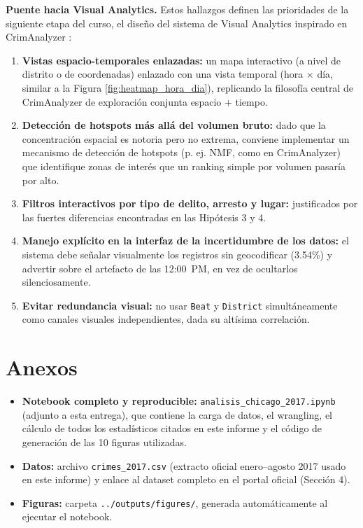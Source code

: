 \documentclass[11pt,a4paper]{article}
\begin{document}
\textbf{Puente hacia Visual Analytics.} Estos hallazgos definen las
prioridades de la siguiente etapa del curso, el diseño del sistema de Visual
Analytics inspirado en CrimAnalyzer \cite{crimanalyzer}:

\begin{enumerate}
    \item \textbf{Vistas espacio-temporales enlazadas:} un mapa interactivo
    (a nivel de distrito o de coordenadas) enlazado con una vista temporal
    (hora $\times$ día, similar a la Figura \ref{fig:heatmap_hora_dia}),
    replicando la filosofía central de CrimAnalyzer de exploración conjunta
    espacio + tiempo.
    \item \textbf{Detección de hotspots más allá del volumen bruto:} dado
    que la concentración espacial es notoria pero no extrema, conviene
    implementar un mecanismo de detección de hotspots (p. ej. NMF, como en
    CrimAnalyzer) que identifique zonas de interés que un ranking simple por
    volumen pasaría por alto.
    \item \textbf{Filtros interactivos por tipo de delito, arresto y lugar:}
    justificados por las fuertes diferencias encontradas en las Hipótesis
    3 y 4.
    \item \textbf{Manejo explícito en la interfaz de la incertidumbre de los
    datos:} el sistema debe señalar visualmente los registros sin
    geocodificar (3.54\%) y advertir sobre el artefacto de las 12:00~PM, en
    vez de ocultarlos silenciosamente.
    \item \textbf{Evitar redundancia visual:} no usar \texttt{Beat} y 
    \texttt{District} simultáneamente como canales visuales independientes,
    dada su altísima correlación.
\end{enumerate}




\section{Anexos}

\begin{itemize}
    \item \textbf{Notebook completo y reproducible:}
    \texttt{analisis\_chicago\_2017.ipynb} (adjunto a esta entrega), que
    contiene la carga de datos, el wrangling, el cálculo de todos los
    estadísticos citados en este informe y el código de generación de las
    10 figuras utilizadas.
    \item \textbf{Datos:} archivo \texttt{crimes\_2017.csv} (extracto
    oficial enero--agosto 2017 usado en este informe) y enlace al dataset
    completo en el portal oficial (Sección 4).
    \item \textbf{Figuras:} carpeta \texttt{../outputs/figures/}, generada
    automáticamente al ejecutar el notebook.
\end{itemize}
\end{document}
